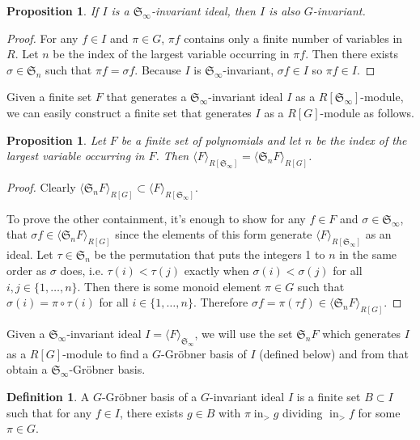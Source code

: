 \documentclass{amsart}
\newtheorem{proposition}[theorem]{Proposition}
\theoremstyle{definition}
\newtheorem{definition}[theorem]{Definition}
\theoremstyle{remark}
\numberwithin{equation}{section}
\newcommand{\<}{\langle}
\renewcommand{\>}{\rangle}
\newcommand{\ideal}[1]{\langle #1 \rangle}
\newcommand{\LT}{\operatorname{in}_>}
\begin{document}
\begin{proposition}
 If $I$ is a ${\mathfrak S}_\infty$-invariant ideal, then $I$ is also $G$-invariant.
\end{proposition}
\begin{proof}
 For any $f \in I$ and $\pi \in G$, $\pi f$ contains only a finite number of variables in $R$.  Let $n$ be the index of the largest variable occurring in $\pi f$.  Then there exists $\sigma \in {\mathfrak S}_n$ such that $\pi f = \sigma f$.  Because $I$ is ${\mathfrak S}_\infty$-invariant, $\sigma f \in I$ so $\pi f \in I$.
\end{proof}

Given a finite set $F$ that generates a ${\mathfrak S}_\infty$-invariant ideal $I$ as a $R[{\mathfrak S}_\infty]$-module, we can easily construct a finite set that generates $I$ as a $R[G]$-module as follows.
\begin{proposition}
 Let $F$ be a finite set of polynomials and let $n$ be the index of the largest variable occurring in $F$.  Then $\ideal{F}_{R[{\mathfrak S}_\infty]} = \ideal{{\mathfrak S}_n F}_{R[G]}$.
\end{proposition}
\begin{proof}
 Clearly $\ideal{{\mathfrak S}_n F}_{R[G]} \subset \ideal{F}_{R[{\mathfrak S}_\infty]}$.

 To prove the other containment, it's enough to show for any $f \in F$ and $\sigma \in {\mathfrak S}_\infty$, that $\sigma f \in \ideal{{\mathfrak S}_n F}_{R[G]}$ since the elements of this form generate $\ideal{F}_{R[{\mathfrak S}_\infty]}$ as an ideal.  Let $\tau \in {\mathfrak S}_n$ be the permutation that puts the integers 1 to $n$ in the same order as $\sigma$ does, i.e. $\tau(i) < \tau(j)$ exactly when $\sigma(i) < \sigma(j)$ for all $i,j \in \{1,\ldots,n\}$.  Then there is some monoid element $\pi \in G$ such that $\sigma(i) = \pi \circ \tau(i)$ for all $i \in \{1,\ldots,n\}$.  Therefore $\sigma f = \pi (\tau f) \in \ideal{{\mathfrak S}_n F}_{R[G]}$.
\end{proof}

Given a ${\mathfrak S}_\infty$-invariant ideal $I = \ideal{F}_{{\mathfrak S}_\infty}$, we will use the set ${\mathfrak S}_n F$ which generates $I$ as a $R[G]$-module to find a $G$-Gr\"obner basis of $I$ (defined below) and from that obtain a ${\mathfrak S}_\infty$-Gr\"obner basis.
\begin{definition}
 A $G$-Gr\"obner basis of a $G$-invariant ideal $I$ is a finite set $B \subset I$ such that for any $f \in I$, there exists $g \in B$ with $\pi \LT{g}$ dividing $\LT{f}$ for some $\pi \in G$.
\end{definition}
\end{document}
